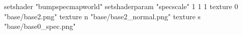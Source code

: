 setshader "bumpspecmapworld"
setshaderparam "specscale" 1 1 1
   texture 0 "base/base2.png"
   texture n "base/base2_normal.png"
   texture s "base/base0_spec.png"